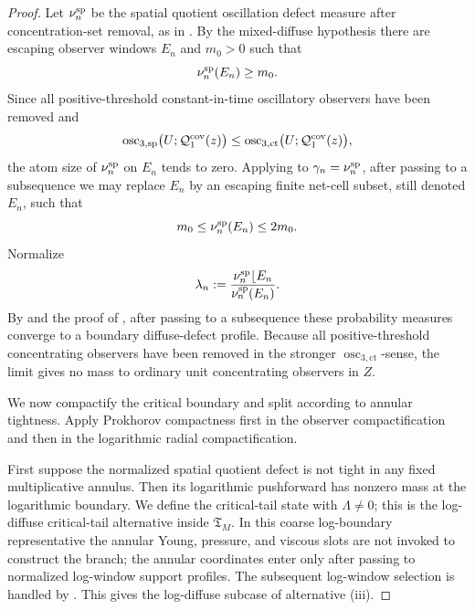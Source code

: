 \documentclass[11pt]{amsart}
\numberwithin{equation}{section}
\theoremstyle{plain}
\theoremstyle{definition}
\theoremstyle{remark}
\newcommand{\Tcrit}{\mathfrak T_M}
\newcommand{\oscsp}{\operatorname{osc}_{3,\mathrm{sp}}}
\newcommand{\actthree}{\operatorname{osc}_{3,\mathrm{ct}}}
\begin{document}
\begin{proof}
Let \(\nu_n^{\rm sp}\) be the spatial quotient oscillation defect measure
after concentration-set removal, as in
.  By the mixed-diffuse
hypothesis there are escaping
observer windows \(E_n\) and \(m_0>0\) such that
\[
   \nu_n^{\rm sp}(E_n)\ge m_0 .
\]
Since all positive-threshold constant-in-time oscillatory observers have been
removed and
\[
   \oscsp\bigl(U;\mathcal Q_1^{\rm cov}(z)\bigr)
   \le
   \actthree\bigl(U;\mathcal Q_1^{\rm cov}(z)\bigr),
\]
the atom size of \(\nu_n^{\rm sp}\) on \(E_n\) tends to zero.  Applying
 to
\(\gamma_n=\nu_n^{\rm sp}\), after passing to a subsequence we may replace
\(E_n\) by an escaping finite net-cell subset, still denoted \(E_n\), such
that
\[
   m_0\le \nu_n^{\rm sp}(E_n)\le 2m_0 .
\]
Normalize
\[
   \lambda_n:=
   \frac{\nu_n^{\rm sp}\lfloor E_n}{\nu_n^{\rm sp}(E_n)} .
\]
By  and the proof of
, after passing to a subsequence these
probability measures converge to a boundary diffuse-defect profile.  Because all
positive-threshold concentrating observers have been removed in the stronger
\(\actthree\)-sense, the limit gives no mass to ordinary unit concentrating observers
in \(Z\).

We now compactify the critical boundary and split according to annular
tightness.  Apply Prokhorov compactness first in the observer compactification
and then in the logarithmic radial compactification.

First suppose the normalized spatial quotient defect is not tight in any fixed
multiplicative annulus.  Then its logarithmic pushforward has nonzero mass at
the logarithmic boundary.  We define the critical-tail state with
\(\Lambda\ne0\); this is the log-diffuse critical-tail alternative inside
\(\Tcrit\).  In this coarse log-boundary representative the annular Young,
pressure, and viscous slots are not invoked to construct the branch; the
annular coordinates enter only after passing to normalized log-window support
profiles.  The subsequent log-window selection is handled by
.
This gives the log-diffuse subcase of alternative \textup{(iii)}.


\end{proof}
\end{document}
